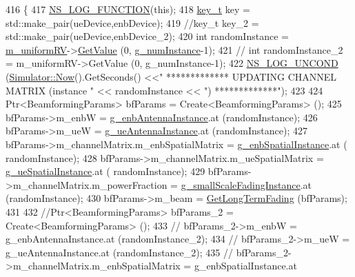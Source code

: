 \begin{DoxyCode}
416 \{
417         \hyperlink{log-macros-disabled_8h_a90b90d5bad1f39cb1b64923ea94c0761}{NS\_LOG\_FUNCTION}(\textcolor{keyword}{this});
418         \hyperlink{namespacens3_aa42bd408e172586b3b192acfaa36b070}{key\_t} key = std::make\_pair(ueDevice,enbDevice);
419         \textcolor{comment}{//key\_t key\_2 = std::make\_pair(ueDevice,enbDevice\_2);}
420         \textcolor{keywordtype}{int} randomInstance = \hyperlink{classns3_1_1MmWaveBeamforming_acde578460be1bc261748dde89e1a9cc4}{m\_uniformRV}->\hyperlink{classns3_1_1UniformRandomVariable_a03822d8c86ac51e9aa83bbc73041386b}{GetValue} (0, 
      \hyperlink{namespacens3_a98a468dea86ef5e50032c3830b2221bd}{g\_numInstance}-1);
421 \textcolor{comment}{//      int randomInstance\_2 = m\_uniformRV->GetValue (0, g\_numInstance-1);}
422         \hyperlink{log-macros-disabled_8h_a0b36e5e182b37194f85ef1c5e979fb2e}{NS\_LOG\_UNCOND} (\hyperlink{classns3_1_1Simulator_ac3178fa975b419f7875e7105be122800}{Simulator::Now}().GetSeconds() <<\textcolor{stringliteral}{" ************* UPDATING
       CHANNEL MATRIX (instance "} << randomInstance << \textcolor{stringliteral}{") *************"});
423 
424         Ptr<BeamformingParams> bfParams = Create<BeamformingParams> ();
425         bfParams->m\_enbW = \hyperlink{namespacens3_a827a472724f90c8c760a2c3c9a8dde7f}{g\_enbAntennaInstance}.at (randomInstance);
426         bfParams->m\_ueW = \hyperlink{namespacens3_a66276c7aee6abe4c6eee2fc7afca5b53}{g\_ueAntennaInstance}.at (randomInstance);
427         bfParams->m\_channelMatrix.m\_enbSpatialMatrix = \hyperlink{namespacens3_afc45dc6f6bc8f2231642ae6ed70787c1}{g\_enbSpatialInstance}.at (
      randomInstance);
428         bfParams->m\_channelMatrix.m\_ueSpatialMatrix = \hyperlink{namespacens3_a7979fdfb339164116e12d41020b221f7}{g\_ueSpatialInstance}.at (
      randomInstance);
429         bfParams->m\_channelMatrix.m\_powerFraction = \hyperlink{namespacens3_a3d08819e638c86c682e9866b22bb286c}{g\_smallScaleFadingInstance}.at
       (randomInstance);
430         bfParams->m\_beam = \hyperlink{classns3_1_1MmWaveBeamforming_aaebee646eb65674e6a52053dca949019}{GetLongTermFading} (bfParams);
431 
432         \textcolor{comment}{//Ptr<BeamformingParams> bfParams\_2 = Create<BeamformingParams> ();}
433         \textcolor{comment}{//      bfParams\_2->m\_enbW = g\_enbAntennaInstance.at (randomInstance\_2);}
434         \textcolor{comment}{//      bfParams\_2->m\_ueW = g\_ueAntennaInstance.at (randomInstance\_2);}
435         \textcolor{comment}{//      bfParams\_2->m\_channelMatrix.m\_enbSpatialMatrix = g\_enbSpatialInstance.at
}
\end{DoxyCode}
